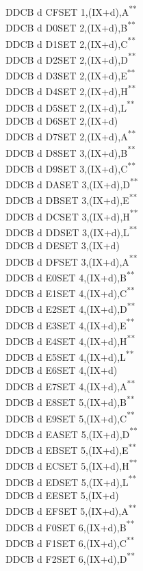 \documentclass[twoside,openright,a4paper]{book}
\newcommand{\UNDOC}{\textnormal{\textsuperscript{**}}}
\begin{document}
\begin{multicols}{3}
{\begin{tabbing}
	DDCB d CF\>SET 1,(IX+d),A\UNDOC\\
	DDCB d D0\>SET 2,(IX+d),B\UNDOC\\
	DDCB d D1\>SET 2,(IX+d),C\UNDOC\\
	DDCB d D2\>SET 2,(IX+d),D\UNDOC\\
	DDCB d D3\>SET 2,(IX+d),E\UNDOC\\
	DDCB d D4\>SET 2,(IX+d),H\UNDOC\\
	DDCB d D5\>SET 2,(IX+d),L\UNDOC\\
	DDCB d D6\>SET 2,(IX+d)\\
	DDCB d D7\>SET 2,(IX+d),A\UNDOC\\
	DDCB d D8\>SET 3,(IX+d),B\UNDOC\\
	DDCB d D9\>SET 3,(IX+d),C\UNDOC\\
	DDCB d DA\>SET 3,(IX+d),D\UNDOC\\
	DDCB d DB\>SET 3,(IX+d),E\UNDOC\\
	DDCB d DC\>SET 3,(IX+d),H\UNDOC\\
	DDCB d DD\>SET 3,(IX+d),L\UNDOC\\
	DDCB d DE\>SET 3,(IX+d)\\
	DDCB d DF\>SET 3,(IX+d),A\UNDOC\\
	DDCB d E0\>SET 4,(IX+d),B\UNDOC\\
	DDCB d E1\>SET 4,(IX+d),C\UNDOC\\
	DDCB d E2\>SET 4,(IX+d),D\UNDOC\\
	DDCB d E3\>SET 4,(IX+d),E\UNDOC\\
	DDCB d E4\>SET 4,(IX+d),H\UNDOC\\
	DDCB d E5\>SET 4,(IX+d),L\UNDOC\\
	DDCB d E6\>SET 4,(IX+d)\\
	DDCB d E7\>SET 4,(IX+d),A\UNDOC\\
	DDCB d E8\>SET 5,(IX+d),B\UNDOC\\
	DDCB d E9\>SET 5,(IX+d),C\UNDOC\\
	DDCB d EA\>SET 5,(IX+d),D\UNDOC\\
	DDCB d EB\>SET 5,(IX+d),E\UNDOC\\
	DDCB d EC\>SET 5,(IX+d),H\UNDOC\\
	DDCB d ED\>SET 5,(IX+d),L\UNDOC\\
	DDCB d EE\>SET 5,(IX+d)\\
	DDCB d EF\>SET 5,(IX+d),A\UNDOC\\
	DDCB d F0\>SET 6,(IX+d),B\UNDOC\\
	DDCB d F1\>SET 6,(IX+d),C\UNDOC\\
	DDCB d F2\>SET 6,(IX+d),D\UNDOC\\

\end{tabbing}}
\end{multicols}
\end{document}
